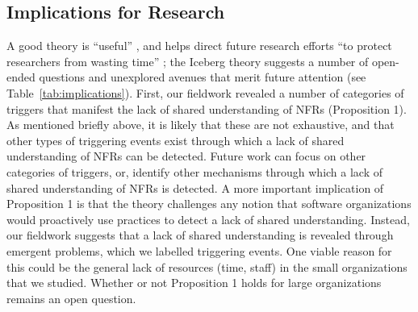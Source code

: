 \documentclass[smallextended]{svjour3}
\begin{document}
\subsection{Implications for Research}
\label{academic}

A good theory  is ``useful'' \citep{mintzberg2017developing}, and helps direct future research efforts ``to protect researchers from wasting time'' \cite[p. 8]{miner1980}; the Iceberg theory suggests a number of open-ended questions and unexplored avenues that merit future attention (see Table~\ref{tab:implications}).
First, our fieldwork revealed a number of categories of triggers that manifest the lack of shared understanding of NFRs (Proposition 1). As mentioned briefly above, it is likely that these are not exhaustive, and that other types of triggering events exist through which a lack of shared understanding of NFRs can be detected. 
Future work can focus on other categories of triggers, or, identify other mechanisms through which a lack of shared understanding of NFRs is detected.
A more important implication of Proposition 1 is that the theory challenges any notion that software organizations would proactively use practices to detect a lack of shared understanding. Instead, our fieldwork suggests that a lack of shared understanding is revealed through emergent problems, which we labelled triggering events. One viable reason for this could be the general lack of resources (time, staff) in the small organizations that we studied. Whether or not Proposition 1 holds for large organizations remains an open question.
\end{document}
